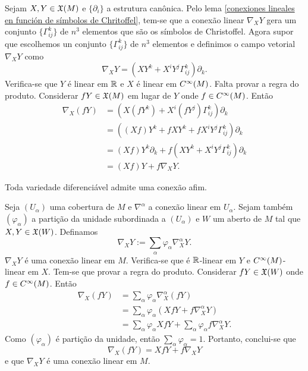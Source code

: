 \begin{demonstracao}
	Sejam $X,Y \in \mathfrak{X}(M)$ e $\{ \partial_i \}$ a estrutura canônica. Pelo lema \ref{conexiones lineales en función de símbolos de Chritoffel}, tem-se que a conexão linear $\nabla_X Y$ gera um conjunto $\{ \Gamma_{ij}^k \}$ de $n^3$ elementos que são os símbolos de Christoffel. Agora supor que escolhemos un conjunto $\{ \Gamma_{ij}^k \} $ de $n^3$ elementos e definimos o campo vetorial $\nabla_X Y$ como
	\begin{equation*}
		\nabla_X Y = (X Y^k + X^i Y^j \Gamma_{ij}^k) \partial_k.
	\end{equation*}
	Verifica-se que $Y$ é linear em $\mathbb{R}$ e $X$ é linear em $C^\infty(M)$. Falta provar a regra do produto. Considerar $fY \in \mathfrak{X}(M)$ em lugar de $Y$ onde $f \in C^\infty(M)$. Então
	\begin{align*}
		\nabla_X (fY) &= (X(f Y^k) + X^i (f Y^j) \Gamma_{ij}^k) \partial_k\\
		&= ( (Xf) Y^k + f X Y^k + f X^i Y^j \Gamma_{ij}^k ) \partial_k\\
		&= (Xf) Y^k \partial_k + f (X Y^k + X^i Y^j \Gamma_{ij}^k) \partial_k\\
		&= (Xf) Y + f \nabla_X Y.
	\end{align*}
\end{demonstracao}

\begin{proposicao}
	Toda variedade diferenciável admite uma conexão afim.
\end{proposicao}

\begin{demonstracao}
	Seja $(U_{\alpha})$ uma cobertura de $M$ e $\nabla^{\alpha}$ a conexão linear em $U_{\alpha}$. Sejam também $(\varphi_{\alpha})$ a partição da unidade subordinada a $(U_{\alpha})$ e $W$ um aberto de $M$ tal que $X,Y \in \mathfrak{X}(W)$. Definamos
	\begin{equation*}
		\nabla_X Y := \sum_{\alpha} \varphi_{\alpha} \nabla_X^{\alpha} Y.
	\end{equation*}
	$\nabla_X Y$ é uma conexão linear em $M$. Verifica-se que é $\mathbb{R}$-linear em $Y$ e $C^\infty(M)$-linear em $X$. Tem-se que provar a regra do produto. Considerar $fY \in \mathfrak{X}(W)$ onde $f \in C^\infty(M)$. Então
	\begin{align*}
		\nabla_X (fY) &= \sum_{\alpha} \varphi_{\alpha} \nabla_X^{\alpha} (fY)\\
		&= \sum_{\alpha} \varphi_{\alpha} (Xf Y + f \nabla_X^{\alpha} Y)\\
		&= \sum_{\alpha} \varphi_{\alpha} X f Y + \sum_{\alpha} \varphi_{\alpha} f \nabla_X^{\alpha} Y. 
	\end{align*}
	Como $(\varphi_{\alpha})$ é partição da unidade, então $\sum_{\alpha} \varphi_{\alpha} = 1$. Portanto, conclui-se que
	\begin{equation*}
		\nabla_X (fY) = X f Y + f \nabla_X Y
	\end{equation*}
	e que $\nabla_X Y$ é uma conexão linear em $M$.
\end{demonstracao}


